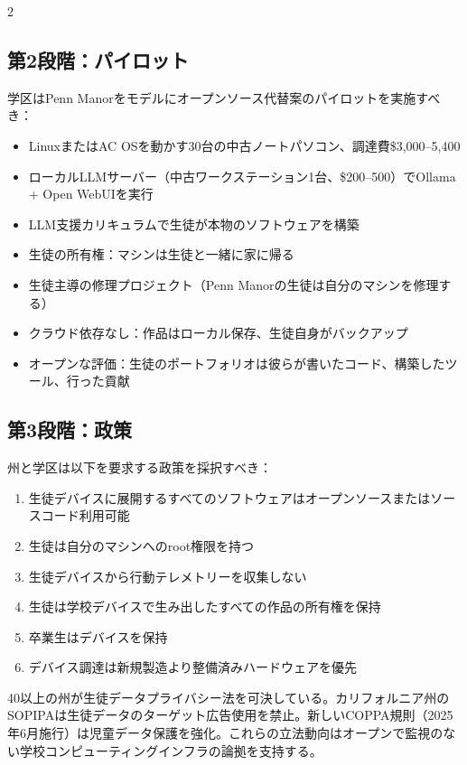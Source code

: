 \documentclass[11pt, a4paper]{article}
\begin{document}
\begin{multicols}{2}
\subsection{第2段階：パイロット}

学区はPenn Manorをモデルにオープンソース代替案のパイロットを実施すべき：

\begin{itemize}
  \item LinuxまたはAC OSを動かす30台の中古ノートパソコン、調達費\$3,000--5,400
  \item ローカルLLMサーバー（中古ワークステーション1台、\$200--500）でOllama + Open WebUIを実行
  \item LLM支援カリキュラムで生徒が本物のソフトウェアを構築
  \item 生徒の所有権：マシンは生徒と一緒に家に帰る
  \item 生徒主導の修理プロジェクト（Penn Manorの生徒は自分のマシンを修理する）
  \item クラウド依存なし：作品はローカル保存、生徒自身がバックアップ
  \item オープンな評価：生徒のポートフォリオは彼らが書いたコード、構築したツール、行った貢献
\end{itemize}

\subsection{第3段階：政策}

州と学区は以下を要求する政策を採択すべき：

\begin{enumerate}
  \item 生徒デバイスに展開するすべてのソフトウェアはオープンソースまたはソースコード利用可能
  \item 生徒は自分のマシンへのroot権限を持つ
  \item 生徒デバイスから行動テレメトリーを収集しない
  \item 生徒は学校デバイスで生み出したすべての作品の所有権を保持
  \item 卒業生はデバイスを保持
  \item デバイス調達は新規製造より整備済みハードウェアを優先
\end{enumerate}

40以上の州が生徒データプライバシー法を可決している。カリフォルニア州のSOPIPAは生徒データのターゲット広告使用を禁止。新しいCOPPA規則（2025年6月施行）は児童データ保護を強化。これらの立法動向はオープンで監視のない学校コンピューティングインフラの論拠を支持する。


\end{multicols}
\end{document}
